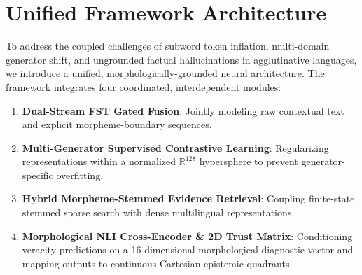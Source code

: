 \section{Unified Framework Architecture}
\label{sec:framework_architecture}

To address the coupled challenges of subword token inflation, multi-domain generator shift, and ungrounded factual hallucinations in agglutinative languages, we introduce a unified, morphologically-grounded neural architecture. The framework integrates four coordinated, interdependent modules:
\begin{enumerate}
    \item \textbf{Dual-Stream FST Gated Fusion}: Jointly modeling raw contextual text and explicit morpheme-boundary sequences.
    \item \textbf{Multi-Generator Supervised Contrastive Learning}: Regularizing representations within a normalized $\mathbb{R}^{128}$ hypersphere to prevent generator-specific overfitting.
    \item \textbf{Hybrid Morpheme-Stemmed Evidence Retrieval}: Coupling finite-state stemmed sparse search with dense multilingual representations.
    \item \textbf{Morphological NLI Cross-Encoder \& 2D Trust Matrix}: Conditioning veracity predictions on a 16-dimensional morphological diagnostic vector and mapping outputs to continuous Cartesian epistemic quadrants.
\end{enumerate}

